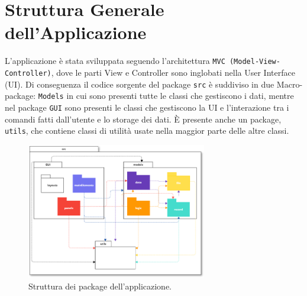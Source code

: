 \NoBgThispage
\section{Struttura Generale dell'Applicazione}
L’applicazione è stata sviluppata seguendo l’architettura \texttt{MVC (Model-View-Controller)}, dove le parti View e Controller sono inglobati nella User Interface (UI).
Di conseguenza il codice sorgente del package \texttt{src} è suddiviso in due Macro-package: \texttt{Models} in cui sono presenti tutte le classi che gestiscono i dati,
mentre nel package \texttt{GUI} sono presenti le classi che gestiscono la UI e l’interazione tra i comandi fatti dall’utente e lo storage dei dati.
È presente anche un package, \texttt{utils}, che contiene classi di utilità usate nella maggior parte delle altre classi.


\begin{figure}[H]
    \centering
    \includegraphics[width=0.7\textwidth]{../../img/package_structure.png}
    \caption{Struttura dei package dell'applicazione.}
\end{figure}
